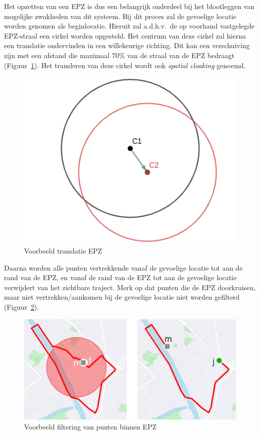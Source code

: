 Het opzetten van een EPZ is dus een belangrijk onderdeel bij het blootleggen
van mogelijke zwakheden van dit systeem. Bij dit proces zal de gevoelige
locatie worden genomen als beginlocatie. Hieruit zal a.d.h.v.\ de op voorhand
vastgelegde EPZ-straal een cirkel worden opgesteld. Het centrum van deze cirkel
zal hierna een translatie ondervinden in een willekeurige richting. Dit kan een
verschuiving zijn met een afstand die maximaal 70\% van de straal van de EPZ
bedraagt (Figuur~\ref{fig:translation}). Het transleren van deze cirkel wordt
ook \textit{spatial cloaking} genoemd.
\begin{figure}[h]
    \centering
    \includegraphics[width=0.4\linewidth]{fig/EPZ-mechanisme/Translation_Center.png}
    \caption{Voorbeeld translatie EPZ}\label{fig:translation}
\end{figure}

Daarna worden alle punten vertrekkende vanaf de gevoelige locatie tot aan de
rand van de EPZ, en vanaf de rand van de EPZ tot aan de gevoelige locatie
verwijdert van het zichtbare traject. Merk op dat punten die de EPZ
doorkruisen, maar niet vertrekken/aankomen bij de gevoelige locatie niet worden
gefilterd (Figuur~\ref{fig:drop points}).
\begin{figure}[h]
    \centering
    \includegraphics[width=0.7\linewidth]{fig/EPZ-mechanisme/DropEPZPoints.png}
    \caption{Voorbeeld filtering van punten binnen EPZ}\label{fig:drop points}
\end{figure}

